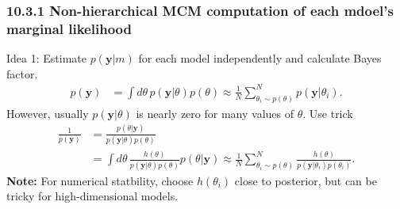 \documentclass[usenames,dvipsnames,table]{beamer}
\begin{document}
\begin{frame}
\frametitle{10.3.1 Non-hierarchical MCM computation of each mdoel's marginal likelihood}

Idea 1: Estimate $p(\mathbf{y}|m)$ for each model independently and calculate Bayes factor.
\begin{align*}
p(\mathbf{y}) &= \int\! d\theta\, p(\mathbf{y}|\theta) p(\theta)
              \approx \frac{1}{N}\sum_{\theta_i \sim p(\theta)}^N p(\mathbf{y}|\theta_i).
\end{align*}
However, usually $p(\mathbf{y}|\theta)$ is nearly zero for many values of $\theta$. Use trick
\begin{align*}
\frac{1}{p(\mathbf{y})} &= \frac{p(\theta|\mathbf{y})}
                                {p(\mathbf{y}|\theta) p(\theta)} \\
                        &= \int\! d\theta\, \frac{h(\theta)}
                                                 {p(\mathbf{y}|\theta) p(\theta)}
                                            p(\theta|\mathbf{y})
              \approx \frac{1}{N}\sum_{\theta_i \sim p(\theta)}^N
                       \frac{h(\theta)}
                            {p(\mathbf{y}|\theta_i) p(\theta_i)}.
\end{align*}
\textbf{Note:} For numerical statbility, choose $h(\theta_i)$ close to posterior, but can be tricky for high-dimensional models.
\end{frame}
\end{document}
